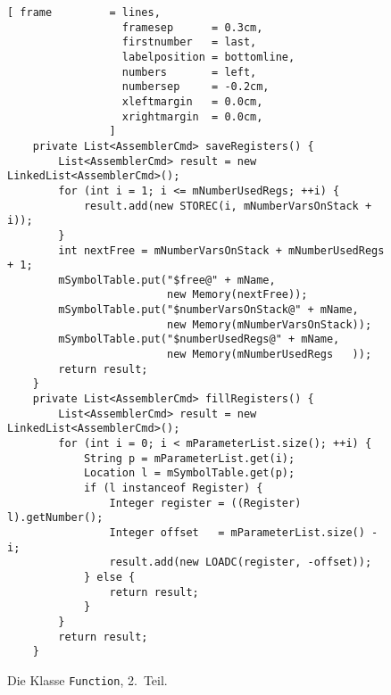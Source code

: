 \begin{figure}[!ht]
\centering
\begin{Verbatim}[ frame         = lines, 
                  framesep      = 0.3cm, 
                  firstnumber   = last,
                  labelposition = bottomline,
                  numbers       = left,
                  numbersep     = -0.2cm,
                  xleftmargin   = 0.0cm,
                  xrightmargin  = 0.0cm,
                ]
    private List<AssemblerCmd> saveRegisters() {
        List<AssemblerCmd> result = new LinkedList<AssemblerCmd>();
        for (int i = 1; i <= mNumberUsedRegs; ++i) {
            result.add(new STOREC(i, mNumberVarsOnStack + i));
        }
        int nextFree = mNumberVarsOnStack + mNumberUsedRegs + 1;
        mSymbolTable.put("$free@" + mName, 
                         new Memory(nextFree));
        mSymbolTable.put("$numberVarsOnStack@" + mName, 
                         new Memory(mNumberVarsOnStack));
        mSymbolTable.put("$numberUsedRegs@" + mName, 
                         new Memory(mNumberUsedRegs   ));
        return result;
    }
    private List<AssemblerCmd> fillRegisters() {
        List<AssemblerCmd> result = new LinkedList<AssemblerCmd>();
        for (int i = 0; i < mParameterList.size(); ++i) {
            String p = mParameterList.get(i);
            Location l = mSymbolTable.get(p);
            if (l instanceof Register) {
                Integer register = ((Register) l).getNumber();
                Integer offset   = mParameterList.size() - i;
                result.add(new LOADC(register, -offset));
            } else {
                return result;
            }
        }
        return result;
    }
\end{Verbatim}
\vspace*{-0.3cm} %
\caption{Die Klasse \texttt{Function}, 2.~Teil.}
\label{fig:Function.java-SRP-2}
\end{figure}


